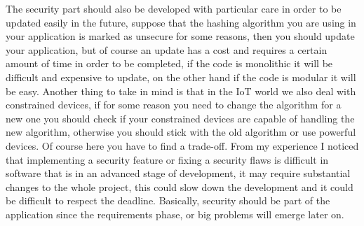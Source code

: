 The security part should also be developed with particular care in order to be updated easily in the future, suppose that the hashing algorithm you are using in your application is marked as unsecure for some reasons, then you should update your application, but of course an update has a cost and requires a certain amount of time in order to be completed, if the code is monolithic it will be difficult and expensive to update, on the other hand if the code is modular it will be easy.\newline
Another thing to take in mind is that in the IoT world we also deal with constrained devices, if for some reason you need to change the algorithm for a new one you should check if your constrained devices are capable of handling the new algorithm, otherwise you should stick with the old algorithm or use powerful devices. Of course here you have to find a trade-off.\newline
From my experience I noticed that implementing a security feature or fixing a security flaws is difficult in software that is in an advanced stage of development, it may require substantial changes to the whole project, this could slow down the development and it could be difficult to respect the deadline.\newline
Basically, security should be part of the application since the requirements phase, or big problems will emerge later on.\newline


